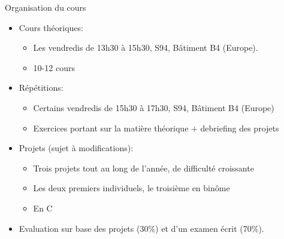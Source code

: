 \begin{frame}{Organisation du cours}
\begin{itemize}
\item Cours théoriques:
\begin{itemize}
\item Les vendredis de 13h30 à 15h30, S94, Bâtiment B4 (Europe).
\item 10-12 cours
\end{itemize}
\item Répétitions:
\begin{itemize}
\item Certains vendredis de 15h30 à 17h30, S94, Bâtiment B4 (Europe)
\item Exercices portant sur la matière théorique + debriefing des projets
\end{itemize}
\item Projets (sujet à modifications):
\begin{itemize}
\item Trois projets tout au long de l'année, de difficulté croissante
\item Les deux premiers individuels, le troisième en binôme
\item En C
\end{itemize}

\bigskip
\item Evaluation sur base des projets (30\%) et d'un examen écrit (70\%).
\end{itemize}
\end{frame}


